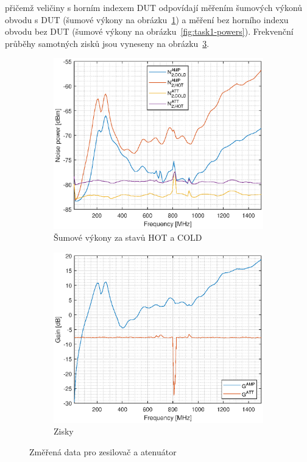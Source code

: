 \documentclass[11pt,a4paper]{article}
\begin{document}
přičemž veličiny s horním indexem $\mathrm{DUT}$ odpovídají měřením šumových výkonů obvodu s DUT (šumové výkony na obrázku~\ref{fig:task2-powers}) a měření bez horního indexu obvodu bez DUT (šumové výkony na obrázku~\ref{fig:task1-powers}). Frekvenční průběhy samotných zisků jsou vyneseny na obrázku~\ref{fig:task2-gains}.
\begin{figure}[!ht]
    \centering
    \begin{subfigure}{.45\textwidth}
        \centering
        \includegraphics[width=\textwidth]{src/task2-powers.eps}
        \caption{Šumové výkony za stavů HOT a COLD}
        \label{fig:task2-powers}
    \end{subfigure}
    \begin{subfigure}{.45\textwidth}
        \centering
        \includegraphics[width=\textwidth]{src/task2-gains.eps}
        \caption{Zisky}
        \label{fig:task2-gains}
    \end{subfigure}
    \caption{Změřená data pro zesilovač a atenuátor}
\end{figure}
\end{document}
